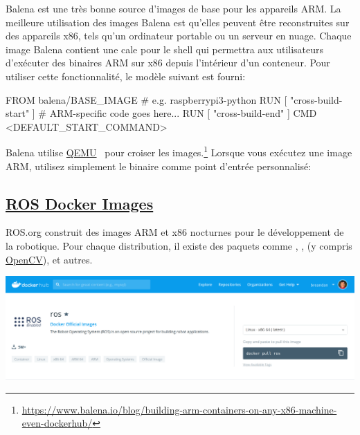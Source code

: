 Balena est une très bonne source d'images de base pour les appareils ARM. La meilleure utilisation des images Balena est qu'elles peuvent être reconstruites sur des appareils x86, tels qu'un ordinateur portable ou un serveur en nuage. Chaque image Balena contient une cale pour le shell qui permettra aux utilisateurs d'exécuter des binaires ARM sur x86 depuis l'intérieur d'un conteneur. Pour utiliser cette fonctionnalité, le modèle  suivant est fourni:
%
\begin{dockerlisting}
FROM balena/BASE_IMAGE # e.g. raspberrypi3-python
RUN [ "cross-build-start" ]
# ARM-specific code goes here...
RUN [ "cross-build-end" ]
CMD <DEFAULT_START_COMMAND>
\end{dockerlisting}
%
Balena utilise \href{https://www.qemu.org/}{QEMU}~\citep{bellard2005qemu} pour croiser les images.\hspace{-.08em}\footnote{\url{https://www.balena.io/blog/building-arm-containers-on-any-x86-machine-even-dockerhub/}} Lorsque vous exécutez une image ARM, utilisez simplement le binaire  comme point d'entrée personnalisé:
%

\subsection{\href{https://hub.docker.com/_/ros}{ROS Docker Images}}

ROS.org construit des images ARM et x86 nocturnes pour le développement de la robotique. Pour chaque distribution, il existe des paquets comme , ,  (y compris \href{https://opencv.org/}{OpenCV}),  et autres.\\
%
\begin{centering}
\includegraphics[width=\textwidth]{../figures/ros_docker_images.png}
\end{centering}

